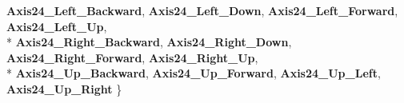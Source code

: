 \begin{DoxyCompactItemize}
{\bfseries Axis24\+\_\+\+Left\+\_\+\+Backward}, 
{\bfseries Axis24\+\_\+\+Left\+\_\+\+Down}, 
{\bfseries Axis24\+\_\+\+Left\+\_\+\+Forward}, 
{\bfseries Axis24\+\_\+\+Left\+\_\+\+Up}, 
\\*
{\bfseries Axis24\+\_\+\+Right\+\_\+\+Backward}, 
{\bfseries Axis24\+\_\+\+Right\+\_\+\+Down}, 
{\bfseries Axis24\+\_\+\+Right\+\_\+\+Forward}, 
{\bfseries Axis24\+\_\+\+Right\+\_\+\+Up}, 
\\*
{\bfseries Axis24\+\_\+\+Up\+\_\+\+Backward}, 
{\bfseries Axis24\+\_\+\+Up\+\_\+\+Forward}, 
{\bfseries Axis24\+\_\+\+Up\+\_\+\+Left}, 
{\bfseries Axis24\+\_\+\+Up\+\_\+\+Right}
 \}\label{namespace_s_e_mod_a_p_i_1_1_interop_ab2d27839356d05fcb1cc10e2088b0b32}

\end{DoxyCompactItemize}
